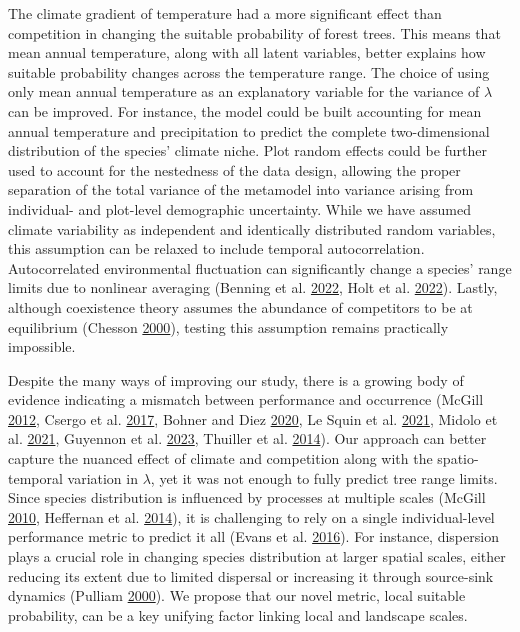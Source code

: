 \documentclass[12pt]{article}
\begin{document}
The climate gradient of temperature had a more significant effect than
competition in changing the suitable probability of forest trees. This
means that mean annual temperature, along with all latent variables,
better explains how suitable probability changes across the temperature
range. The choice of using only mean annual temperature as an
explanatory variable for the variance of \(\lambda\) can be improved.
For instance, the model could be built accounting for mean annual
temperature and precipitation to predict the complete two-dimensional
distribution of the species' climate niche. Plot random effects could be
further used to account for the nestedness of the data design, allowing
the proper separation of the total variance of the metamodel into
variance arising from individual- and plot-level demographic
uncertainty. While we have assumed climate variability as independent
and identically distributed random variables, this assumption can be
relaxed to include temporal autocorrelation. Autocorrelated
environmental fluctuation can significantly change a species' range
limits due to nonlinear averaging (Benning et al.
\protect\hyperlink{ref-Benning2022}{2022}, Holt et al.
\protect\hyperlink{ref-Holt2022}{2022}). Lastly, although coexistence
theory assumes the abundance of competitors to be at equilibrium
(Chesson \protect\hyperlink{ref-Chesson2000a}{2000}), testing this
assumption remains practically impossible.

Despite the many ways of improving our study, there is a growing body of
evidence indicating a mismatch between performance and occurrence
(McGill \protect\hyperlink{ref-McGill2012}{2012}, Csergo et al.
\protect\hyperlink{ref-Csergo2017}{2017}, Bohner and Diez
\protect\hyperlink{ref-bohner2020}{2020}, Le Squin et al.
\protect\hyperlink{ref-LeSquin2021}{2021}, Midolo et al.
\protect\hyperlink{ref-Midolo2021}{2021}, Guyennon et al.
\protect\hyperlink{ref-Guyennon2023}{2023}, Thuiller et al.
\protect\hyperlink{ref-Thuiller2014}{2014}). Our approach can better
capture the nuanced effect of climate and competition along with the
spatio-temporal variation in \(\lambda\), yet it was not enough to fully
predict tree range limits. Since species distribution is influenced by
processes at multiple scales (McGill
\protect\hyperlink{ref-McGill2010}{2010}, Heffernan et al.
\protect\hyperlink{ref-Heffernan2014}{2014}), it is challenging to rely
on a single individual-level performance metric to predict it all (Evans
et al. \protect\hyperlink{ref-Evans2016}{2016}). For instance,
dispersion plays a crucial role in changing species distribution at
larger spatial scales, either reducing its extent due to limited
dispersal or increasing it through source-sink dynamics (Pulliam
\protect\hyperlink{ref-Pulliam2000}{2000}). We propose that our novel
metric, local suitable probability, can be a key unifying factor linking
local and landscape scales.
\end{document}
